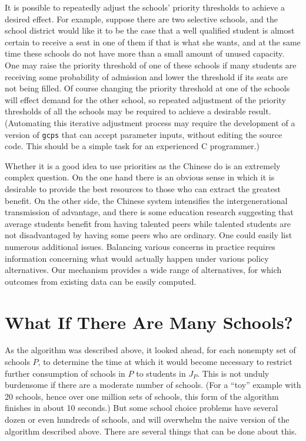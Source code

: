 \documentclass[12pt]{article}
\theoremstyle{definition}
\begin{document}
It is possible to repeatedly adjust the schools' priority thresholds
to achieve a desired effect.  For example, suppose there are two
selective schools, and the school district would like it to be the
case that a well qualified student is almost certain to receive a seat
in one of them if that is what she wants, and at the same time these
schools do not have more than a small amount of unused capacity.  One
may raise the priority threshold of one of these schools if many
students are receiving some probability of admission and lower the
threshold if its seats are not being filled.  Of course changing the
priority threshold at one of the schools will effect demand for the
other school, so repeated adjustment of the priority thresholds of all
the schools may be required to achieve a desirable result.
(Automating this iterative adjustment process may require the
development of a version of \texttt{gcps} that can accept parameter
inputs, without editing the source code.  This should be a simple task
for an experienced C programmer.)

Whether it is a good idea to use priorities as the Chinese do is an
extremely complex question.  On the one hand there is an obvious sense
in which it is desirable to provide the best resources to those who
can extract the greatest benefit.  On the other side, the Chinese
system intensifies the intergenerational transmission of advantage,
and there is some education research suggesting that average students
benefit from having talented peers while talented students are not
disadvantaged by having some peers who are ordinary. One could easily
list numerous additional issues.  Balancing various concerns in
practice requires information concerning what would actually happen
under various policy alternatives.  Our mechanism provides a wide
range of alternatives, for which outcomes from existing data can be
easily computed.

\section{What If There Are Many Schools?} \label{sec:ManySchools}

As the algorithm was described above, it looked ahead, for each
nonempty set of schools $P$, to determine the time at which it would
become necessary to restrict further consumption of schools in $P$ to
students in $J_P$.  This is not unduly burdensome if there are a
moderate number of schools.  (For a ``toy'' example with 20 schools,
hence over one million sets of schools, this form of the algorithm
finishes in about 10 seconds.)  But some school choice problems have
several dozen or even hundreds of schools, and will overwhelm the
naive version of the algorithm described above.  There are several
things that can be done about this.
\end{document}
